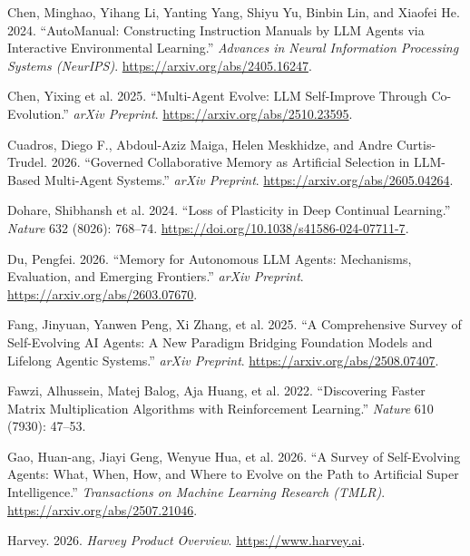 \documentclass[
]{article}
\newlength{\cslhangindent}
\newenvironment{CSLReferences}[2] %
 {\begin{list}{}{%
  \setlength{\itemindent}{0pt}
  \setlength{\leftmargin}{0pt}
  \setlength{\parsep}{0pt}
  \ifodd #1
   \setlength{\leftmargin}{\cslhangindent}
   \setlength{\itemindent}{-1\cslhangindent}
  \fi
  \setlength{\itemsep}{#2\baselineskip}}}
 {\end{list}}
\begin{document}
\begin{CSLReferences}{1}{1}
Chen, Minghao, Yihang Li, Yanting Yang, Shiyu Yu, Binbin Lin, and
Xiaofei He. 2024. {``{AutoManual}: Constructing Instruction Manuals by
{LLM} Agents via Interactive Environmental Learning.''} \emph{Advances
in Neural Information Processing Systems (NeurIPS)}.
\url{https://arxiv.org/abs/2405.16247}.

{Chen, Yixing et al.} 2025. {``Multi-Agent Evolve: {LLM} Self-Improve
Through Co-Evolution.''} \emph{arXiv Preprint}.
\url{https://arxiv.org/abs/2510.23595}.

Cuadros, Diego F., Abdoul-Aziz Maiga, Helen Meskhidze, and Andre
Curtis-Trudel. 2026. {``Governed Collaborative Memory as Artificial
Selection in {LLM}-Based Multi-Agent Systems.''} \emph{arXiv Preprint}.
\url{https://arxiv.org/abs/2605.04264}.

{Dohare, Shibhansh et al.} 2024. {``Loss of Plasticity in Deep Continual
Learning.''} \emph{Nature} 632 (8026): 768--74.
\url{https://doi.org/10.1038/s41586-024-07711-7}.

Du, Pengfei. 2026. {``Memory for Autonomous {LLM} Agents: Mechanisms,
Evaluation, and Emerging Frontiers.''} \emph{arXiv Preprint}.
\url{https://arxiv.org/abs/2603.07670}.

{Fang, Jinyuan, Yanwen Peng, Xi Zhang, et al.} 2025. {``A Comprehensive
Survey of Self-Evolving {AI} Agents: A New Paradigm Bridging Foundation
Models and Lifelong Agentic Systems.''} \emph{arXiv Preprint}.
\url{https://arxiv.org/abs/2508.07407}.

{Fawzi, Alhussein, Matej Balog, Aja Huang, et al.} 2022. {``Discovering
Faster Matrix Multiplication Algorithms with Reinforcement Learning.''}
\emph{Nature} 610 (7930): 47--53.

{Gao, Huan-ang, Jiayi Geng, Wenyue Hua, et al.} 2026. {``A Survey of
Self-Evolving Agents: What, When, How, and Where to Evolve on the Path
to Artificial Super Intelligence.''} \emph{Transactions on Machine
Learning Research (TMLR)}. \url{https://arxiv.org/abs/2507.21046}.

Harvey. 2026. \emph{Harvey Product Overview}.
\url{https://www.harvey.ai}.


\end{CSLReferences}
\end{document}
